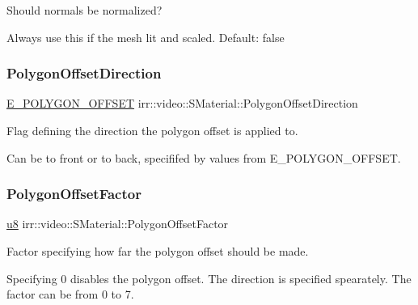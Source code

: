 Should normals be normalized? 

Always use this if the mesh lit and scaled. Default\+: false \mbox{\label{classirr_1_1video_1_1SMaterial_ab3da2285d0e74fc99eafdd8944ea4eb8}} 
\subsubsection{\texorpdfstring{Polygon\+Offset\+Direction}{PolygonOffsetDirection}}
{\footnotesize\ttfamily \hyperlink{namespaceirr_1_1video_a812b866b910c946f5bc813f8eab31144}{E\+\_\+\+P\+O\+L\+Y\+G\+O\+N\+\_\+\+O\+F\+F\+S\+ET} irr\+::video\+::\+S\+Material\+::\+Polygon\+Offset\+Direction}



Flag defining the direction the polygon offset is applied to. 

Can be to front or to back, specififed by values from E\+\_\+\+P\+O\+L\+Y\+G\+O\+N\+\_\+\+O\+F\+F\+S\+ET. \mbox{\label{classirr_1_1video_1_1SMaterial_afa24a258ca0ca5eff3b66a3f8aa04462}} 
\subsubsection{\texorpdfstring{Polygon\+Offset\+Factor}{PolygonOffsetFactor}}
{\footnotesize\ttfamily \hyperlink{namespaceirr_a646874f69af8ff87fc10201b0254a761}{u8} irr\+::video\+::\+S\+Material\+::\+Polygon\+Offset\+Factor}



Factor specifying how far the polygon offset should be made. 

Specifying 0 disables the polygon offset. The direction is specified spearately. The factor can be from 0 to 7. \mbox{\label{classirr_1_1video_1_1SMaterial_a877106a83108db6d1f30a38379d28494}} 
